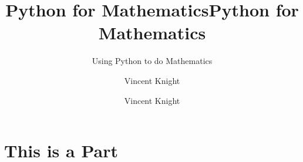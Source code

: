 \documentclass[Alon2,singlecolor,11pt]{Alon}%
\title{Python for Mathematics}
\author{Vincent Knight}
\begin{document}
\frontmatter





\title{Python for Mathematics} %
\subtitle{Using Python to do Mathematics}


\author{Vincent Knight}%


\maketitle


\cleardoublepage
\setcounter{page}{7} %
\listoffigures
\listoftables





\mainmatter

\part{This is a Part}


% 


% 
% 

\printindex
\cleardoublepage
\end{document}

